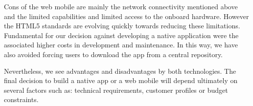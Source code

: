 Cons of the web mobile are mainly the network connectivity mentioned
above and the limited capabilities and limited access to the onboard
hardware. However the HTML5 standards are evolving quickly towards
reducing these limitations. Fundamental for our decision against
developing a native application were the associated higher costs in
development and maintenance. In this way, we have also avoided forcing
users to download the app from a central repository.

Nevertheless, we see advantages and disadvantages by both
technologies. The final decision to build a native app or a web mobile
will depend ultimately on several factors such as: technical
requirements, customer profiles or budget constraints.



